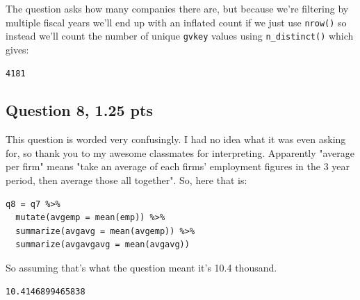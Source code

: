 \documentclass[11pt]{article}
\begin{document}
The question asks how many companies there are, but because we're filtering by multiple fiscal years we'll end up with an inflated count if we just use \texttt{nrow()} so instead we'll count the number of unique \texttt{gvkey} values using \texttt{n\_distinct()} which gives:

\begin{verbatim}
4181
\end{verbatim}

\subsection*{Question 8, 1.25 pts}
\label{sec:orgb3c8866}
This question is worded very confusingly.  I had no idea what it was even asking for, so thank you to my awesome classmates for interpreting.  Apparently "average per firm" means "take an average of each firms' employment figures in the 3 year period, then average those all together".  So, here that is:

\begin{verbatim}
q8 = q7 %>%
  mutate(avgemp = mean(emp)) %>%
  summarize(avgavg = mean(avgemp)) %>%
  summarize(avgavgavg = mean(avgavg))
\end{verbatim}

So assuming that's what the question meant it's 10.4 thousand.

\begin{verbatim}
10.4146899465838
\end{verbatim}
\end{document}
